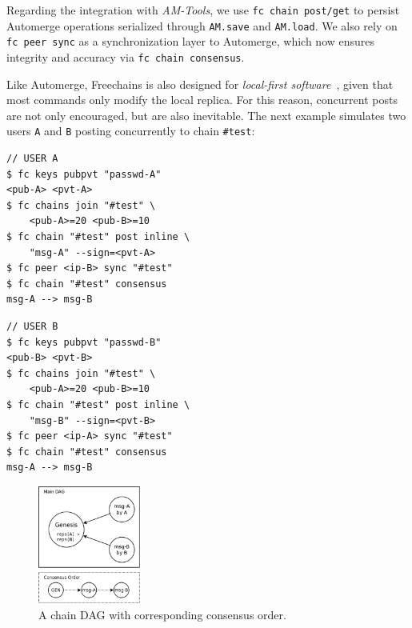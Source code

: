 \documentclass[12pt]{article}
\newcommand{\AMT}      {\emph{AM-Tools}\xspace}
\newcommand{\code}[1]  {\texttt{\footnotesize{#1}}}
\begin{document}
Regarding the integration with \AMT, we use \code{fc~chain~post/get} to persist
Automerge operations serialized through \code{AM.save} and \code{AM.load}.
We also rely on \code{fc~peer~sync} as a synchronization layer to Automerge,
which now ensures integrity and accuracy via \code{fc~chain~consensus}.

Like Automerge, Freechains is also designed for
\emph{local-first software}~\cite{p2p.local}, given that most commands only
modify the local replica.
For this reason, concurrent posts are not only encouraged, but are also
inevitable.
The next example simulates two users \code{A} and \code{B} posting concurrently
to chain \code{\#test}:

\noindent
{\footnotesize
\begin{minipage}[t]{0.5\textwidth}
\begin{verbatim}
// USER A
$ fc keys pubpvt "passwd-A"
<pub-A> <pvt-A>
$ fc chains join "#test" \
    <pub-A>=20 <pub-B>=10
$ fc chain "#test" post inline \
    "msg-A" --sign=<pvt-A>
$ fc peer <ip-B> sync "#test"
$ fc chain "#test" consensus
msg-A --> msg-B
\end{verbatim}
\end{minipage}
\begin{minipage}[t]{0.5\textwidth}
\begin{verbatim}
// USER B
$ fc keys pubpvt "passwd-B"
<pub-B> <pvt-B>
$ fc chains join "#test" \
    <pub-A>=20 <pub-B>=10
$ fc chain "#test" post inline \
    "msg-B" --sign=<pvt-B>
$ fc peer <ip-A> sync "#test"
$ fc chain "#test" consensus
msg-A --> msg-B
\end{verbatim}
\end{minipage}
}

\begin{figure}
    \includegraphics[width=0.3\textwidth]{dag.png}
    \caption{A chain DAG with corresponding consensus order.}
    \label{fig.dag}
\end{figure}
\end{document}

